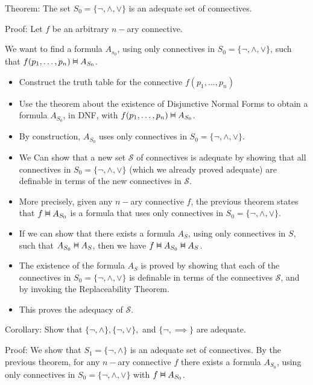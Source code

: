 \documentclass{article}
\newcommand{\vDashv}{%
  \mathrel{%
    \text{%
      \ooalign{$\vDash$\cr\reflectbox{$\vDash$}\cr}%
    }%
  }%
}
\begin{document}
Theorem: The set $S_0 = \{ \neg, \wedge, \vee\}$ is an adequate set of connectives. 

Proof: Let $f$ be an arbitrary $n-$ary connective.

We want to find a formula $A_{s_0}$, using only connectives in $S_0 = \{\neg, \wedge, \vee\}$, such that $f(p_1, \ldots, p_n) \vDashv A_{S_0}$.

\begin{itemize}
    \item Construct the truth table for the connective $f(p_1, \ldots, p_n)$
    \item Use the theorem about the existence of Disjunctive Normal Forms to obtain a formula $A_{S_0}$, in DNF, with $f(p_1, \ldots, p_n) \vDashv A_{S_0}$.
    \item By construction, $A_{S_0}$ uses only connectives in $S_0 = \{\neg, \wedge, \vee\}$.
    \item We Can show that a new set $\mathcal{S}$ of connectives is adequate by showing that all connectives in $S_0 = \{\neg, \wedge, \vee\}$ (which we already proved adequate) are definable in terms of the new connectives in $\mathcal{S}$. 
    \item More precisely, given any $n-$ary connective $f$, the previous theorem states that $f \vDashv A_{S_0}$ is a formula that uses only connectives in $S_0 = \{\neg, \wedge, \vee\}$. 
    \item If we can show that there exists a formula $A_S$, using only connectives in $S$, such that $A_{S_0} \vDashv A_S$, then we have $f \vDashv A_{S_0} \vDashv A_{S}$.
    \item The existence of the formula $A_S$ is proved by showing that each of the connectives in $S_0 = \{\neg, \wedge, \vee\}$ is definable in terms of the connectives $\mathcal{S}$, and by invoking the Replaceability Theorem. 
    \item This proves the adequacy of $\mathcal{S}$. 
\end{itemize}

Corollary: Show that $\{\neg, \wedge\}, \{\neg, \vee\},$ and $\{\neg, \implies\}$ are adequate. 

Proof: We show that $S_1 = \{\neg, \wedge\}$ is an adequate set of connectives. By the previous theorem, for any $n-$ary connective $f$ there exists a formula $A_{S_0}$, using only connectives in $S_0 = \{\neg, \wedge, \vee\}$ with $f \vDashv A_{S_0}$.
\end{document}
